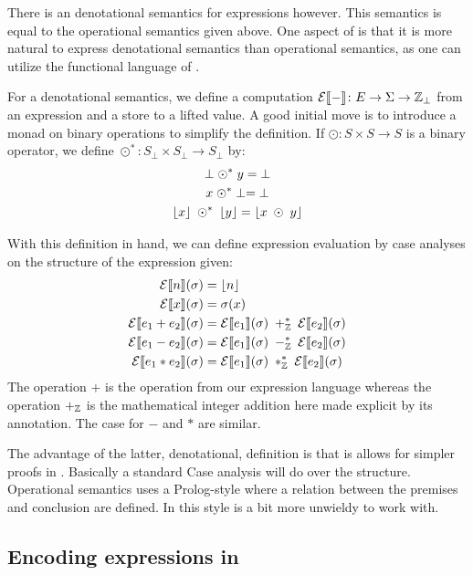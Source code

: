 There is an denotational semantics for expressions
however. This semantics is equal to the operational semantics given
above. One aspect of \coq{} is that it is more natural to express
denotational semantics than operational semantics, as one can utilize
the functional language of \gallina{}.

\label{exp:denot-semantics}
For a denotational semantics, we define a computation
$\mathcal{E}|[-|] \colon E \to \Sigma \to \mathbb{Z}_{\perp}$ from an
expression and a store to a lifted value. A good initial move
is to introduce a monad on binary operations to simplify the
definition. If $\odot \colon S \times S \to S$ is a binary operator,
we define $\odot^{*} \colon S_{\perp} \times S_{\perp} \to S_{\perp}$ by:
\begin{gather*}
  \perp \odot^{*}\; y =\; \perp\\
  x \; \odot^{*} \perp =\; \perp\\
  \lfloor x \rfloor \; \odot^{*}\;  \lfloor y \rfloor = \lfloor x \; \odot \; y \rfloor
\end{gather*}

With this definition in hand, we can define expression evaluation by
case analyses on the structure of the expression given:
\begin{align*}
  \mathcal{E}|[n|](\sigma) & = \lfloor n \rfloor\\
  \mathcal{E}|[x|](\sigma) & = \sigma (x)\\
  \mathcal{E}|[e_1 + e_2|](\sigma) & = \mathcal{E}|[e_1|](\sigma) \;
  +_{\mathbb{Z}}^{*} \;
  \mathcal{E}|[e_2|](\sigma)\\
  \mathcal{E}|[e_1 - e_2|](\sigma) & = \mathcal{E}|[e_1|](\sigma) \;
  -_{\mathbb{Z}}^{*} \;
  \mathcal{E}|[e_2|](\sigma)\\
  \mathcal{E}|[e_1 * e_2|](\sigma) & = \mathcal{E}|[e_1|](\sigma) \;
  *_{\mathbb{Z}}^{*} \;
  \mathcal{E}|[e_2|](\sigma)
\end{align*}
The operation $+$ is the operation from our expression language
whereas the operation $+_{\mathbb{Z}}$ is the mathematical integer addition
here made explicit by its annotation. The case for $-$ and
$*$ are similar.

The advantage of the latter, denotational, definition is that is
allows for simpler proofs in \coq{}. Basically a standard Case analysis
will do over the structure. Operational semantics uses a Prolog-style
where a relation between the premises and conclusion are defined. In
\coq{} this style is a bit more unwieldy to work with.

\subsection{Encoding expressions in \coq{}}

